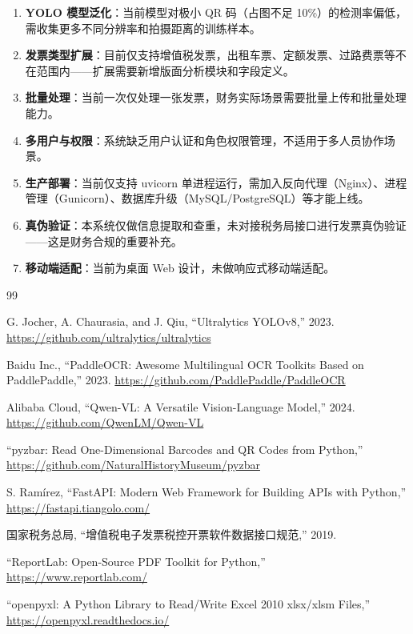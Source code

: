 \documentclass[12pt,a4paper]{ctexart}
\begin{document}
\begin{enumerate}[label=(\arabic*)]
  \item \textbf{YOLO 模型泛化}：当前模型对极小 QR 码（占图不足 10\%）的检测率偏低，需收集更多不同分辨率和拍摄距离的训练样本。
  \item \textbf{发票类型扩展}：目前仅支持增值税发票，出租车票、定额发票、过路费票等不在范围内——扩展需要新增版面分析模块和字段定义。
  \item \textbf{批量处理}：当前一次仅处理一张发票，财务实际场景需要批量上传和批量处理能力。
  \item \textbf{多用户与权限}：系统缺乏用户认证和角色权限管理，不适用于多人员协作场景。
  \item \textbf{生产部署}：当前仅支持 uvicorn 单进程运行，需加入反向代理（Nginx）、进程管理（Gunicorn）、数据库升级（MySQL/PostgreSQL）等才能上线。
  \item \textbf{真伪验证}：本系统仅做信息提取和查重，未对接税务局接口进行发票真伪验证——这是财务合规的重要补充。
  \item \textbf{移动端适配}：当前为桌面 Web 设计，未做响应式移动端适配。
\end{enumerate}


\clearpage
{}
{}
\begin{thebibliography}{99}

G. Jocher, A. Chaurasia, and J. Qiu, ``Ultralytics YOLOv8,'' 2023.
\url{https://github.com/ultralytics/ultralytics}

Baidu Inc., ``PaddleOCR: Awesome Multilingual OCR Toolkits Based on PaddlePaddle,'' 2023.
\url{https://github.com/PaddlePaddle/PaddleOCR}

Alibaba Cloud, ``Qwen-VL: A Versatile Vision-Language Model,'' 2024.
\url{https://github.com/QwenLM/Qwen-VL}

``pyzbar: Read One-Dimensional Barcodes and QR Codes from Python,''
\url{https://github.com/NaturalHistoryMuseum/pyzbar}

S. Ram\'irez, ``FastAPI: Modern Web Framework for Building APIs with Python,''
\url{https://fastapi.tiangolo.com/}

国家税务总局, ``增值税电子发票税控开票软件数据接口规范,'' 2019.

``ReportLab: Open-Source PDF Toolkit for Python,''
\url{https://www.reportlab.com/}

``openpyxl: A Python Library to Read/Write Excel 2010 xlsx/xlsm Files,''
\url{https://openpyxl.readthedocs.io/}

\end{thebibliography}
\end{document}
